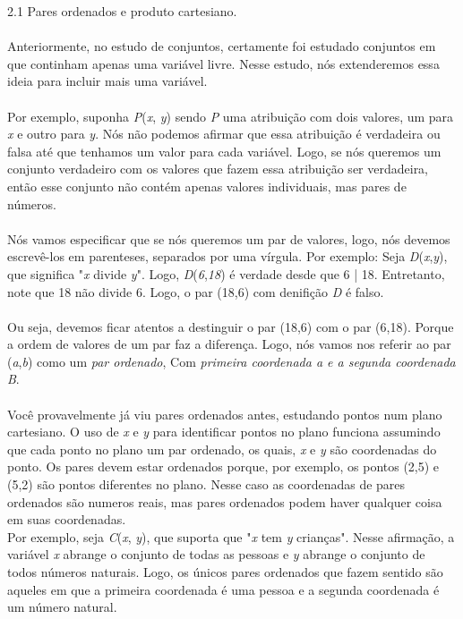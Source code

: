 
{\large 2.1 Pares ordenados e produto cartesiano.}
\\
\\


Anteriormente, no estudo de conjuntos, certamente foi estudado conjuntos em que continham apenas uma variável livre.
Nesse estudo, nós extenderemos essa ideia para incluir mais uma variável.
\\
\\
Por exemplo, suponha \textit{P}(\textit{x}, \textit{y}) sendo \textit{P} uma atribuição com dois valores, um para \textit{x} 
e outro para \textit{y}. Nós não podemos afirmar que essa atribuição é verdadeira ou falsa até que tenhamos um valor para cada
variável. Logo, se nós queremos um conjunto verdadeiro com os valores que fazem essa atribuição ser verdadeira, então esse 
conjunto não contém apenas valores individuais, mas pares de números.
\\
\\
Nós vamos especificar que se nós queremos um par de valores, logo, nós devemos escrevê-los em parenteses, separados por uma 
vírgula. Por exemplo: Seja \textit{D}(\textit{x},\textit{y}), que significa "\textit{x} divide \textit{y}". Logo,
\textit{D}(\textit{6},\textit{18}) é verdade desde que 6 | 18. Entretanto, note que 18 não divide 6. Logo, o par (18,6) 
com denifição \textit{D} é falso.
\\
\\
Ou seja, devemos ficar atentos a destinguir o par (18,6) com o par (6,18). Porque a ordem de valores de um par faz a diferença.
Logo, nós vamos nos referir ao par (\textit{a},\textit{b}) como um \textit{par ordenado}, Com \textit{primeira coordenada a e 
a segunda coordenada B}.
\\
\\
Você provavelmente já viu pares ordenados antes, estudando pontos num plano cartesiano. O uso de \textit{x} e \textit{y} para 
identificar pontos no plano funciona assumindo que cada ponto no plano um par ordenado, os quais, \textit{x} e \textit{y} são
coordenadas do ponto. Os pares devem estar ordenados porque, por exemplo, os pontos (2,5) e (5,2) são pontos diferentes no plano.
Nesse caso as coordenadas de pares ordenados são numeros reais, mas pares ordenados podem haver qualquer coisa em suas coordenadas.
\\
Por exemplo, seja \textit{C}(\textit{x}, \textit{y}), que suporta que "\textit{x} tem \textit{y} crianças". Nesse afirmação, a 
variável \textit{x} abrange o conjunto de todas as pessoas e \textit{y} abrange o conjunto de todos números naturais. Logo, os 
únicos pares ordenados que fazem sentido são aqueles em que a primeira coordenada é uma pessoa e a segunda coordenada é um número
natural.
\\

